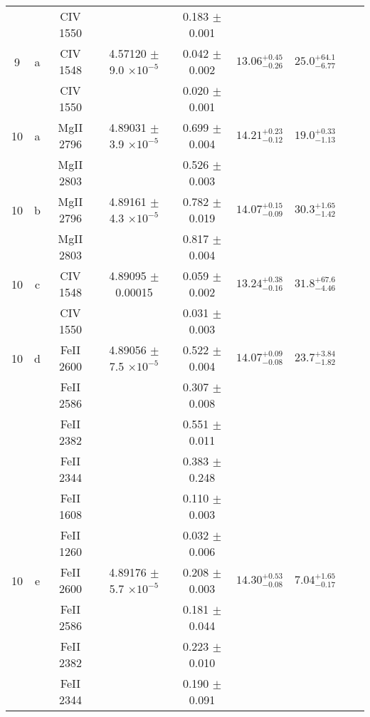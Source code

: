 \documentclass[12pt]{article}
\begin{document}
\begin{footnotesize}
\begin{longtable}{ c c c c c c c c c}
  &   & CIV     1550  &  &  0.183 $\pm$ 0.001   &   &     & 	 & \\ 
       9  & a  & CIV     1548  &  4.57120 $\pm$ 9.0 $\times 10^{-5}$   &  0.042 $\pm$ 0.002   & $13.06_{ - 0.26}^{ + 0.45}$  & $25.0_{ - 6.77}^{ + 64.1}$    & 	 & \\ 
  &   & CIV     1550  &  &  0.020 $\pm$ 0.001   &   &     & 	 & \\ 
      10  & a  & MgII     2796  &  4.89031 $\pm$ 3.9 $\times 10^{-5}$   &  0.699 $\pm$ 0.004   & $14.21_{ - 0.12}^{ + 0.23}$  & $19.0_{ - 1.13}^{ + 0.33}$    & 	 & \\ 
  &   & MgII     2803  &  &  0.526 $\pm$ 0.003   &   &     & 	 & \\ 
      10  & b  & MgII     2796  &  4.89161 $\pm$ 4.3 $\times 10^{-5}$   &  0.782 $\pm$ 0.019   & $14.07_{ - 0.09}^{ + 0.15}$  & $30.3_{ - 1.42}^{ + 1.65}$    & 	 & \\ 
  &   & MgII     2803  &  &  0.817 $\pm$ 0.004   &   &     & 	 & \\ 
      10  & c  & CIV     1548  &  4.89095 $\pm$ 0.00015  &  0.059 $\pm$ 0.002   & $13.24_{ - 0.16}^{ + 0.38}$  & $31.8_{ - 4.46}^{ + 67.6}$    & 	 & \\ 
  &   & CIV     1550  &  &  0.031 $\pm$ 0.003   &   &     & 	 & \\ 
      10  & d  & FeII     2600  &  4.89056 $\pm$ 7.5 $\times 10^{-5}$   &  0.522 $\pm$ 0.004   & $14.07_{ - 0.08}^{ + 0.09}$  & $23.7_{ - 1.82}^{ + 3.84}$    & 	 & \\ 
  &   & FeII     2586  &  &  0.307 $\pm$ 0.008   &   &     & 	 & \\ 
  &   & FeII     2382  &  &  0.551 $\pm$ 0.011   &   &     & 	 & \\ 
  &   & FeII     2344  &  &  0.383 $\pm$ 0.248   &   &     & 	 & \\ 
  &   & FeII     1608  &  &  0.110 $\pm$ 0.003   &   &     & 	 & \\ 
  &   & FeII     1260  &  &  0.032 $\pm$ 0.006   &   &     & 	 & \\ 
      10  & e  & FeII     2600  &  4.89176 $\pm$ 5.7 $\times 10^{-5}$   &  0.208 $\pm$ 0.003   & $14.30_{ - 0.08}^{ + 0.53}$  & $7.04_{ - 0.17}^{ + 1.65}$    & 	 & \\ 
  &   & FeII     2586  &  &  0.181 $\pm$ 0.044   &   &     & 	 & \\ 
  &   & FeII     2382  &  &  0.223 $\pm$ 0.010   &   &     & 	 & \\ 
  &   & FeII     2344  &  &  0.190 $\pm$ 0.091   &   &     & 	 & \\ 

\end{longtable}
\end{footnotesize}
\end{document}
